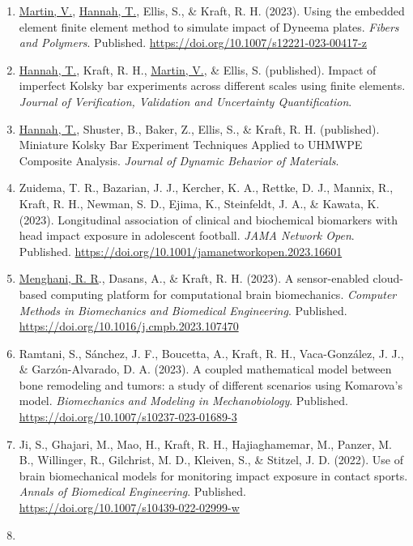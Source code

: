 \documentclass[11pt]{article}
\begin{document}
\begin{enumerate}
\def\labelenumi{\arabic{enumi}.}
\item
  \underline{Martin, V.}, \underline{Hannah, T.}, Ellis, S., \& Kraft, R. 
H. 
(2023). 
Using the
  embedded element finite element method to simulate impact of Dyneema
  plates. 
\emph{Fibers and Polymers}. 
Published.
  \url{https://doi.org/10.1007/s12221-023-00417-z}
\item
  \underline{Hannah, T.}, Kraft, R. 
H., \underline{Martin, V.}, \& Ellis, S. 
(published). 
Impact
  of imperfect Kolsky bar experiments across different scales using
  finite elements. 
\emph{Journal of Verification, Validation and
  Uncertainty Quantification}.
\item
  \underline{Hannah, T.}, Shuster, B., Baker, Z., Ellis, S., \& Kraft, R. 
H.
  (published). 
Miniature Kolsky Bar Experiment Techniques Applied to
  UHMWPE Composite Analysis. 
\emph{Journal of Dynamic Behavior of
  Materials}.
\item
  Zuidema, T. 
R., Bazarian, J. 
J., Kercher, K. 
A., Rettke, D. 
J.,
  Mannix, R., Kraft, R. 
H., Newman, S. 
D., Ejima, K., Steinfeldt, J. 
A.,
  \& Kawata, K. 
(2023). 
Longitudinal association of clinical and
  biochemical biomarkers with head impact exposure in adolescent
  football. 
\emph{JAMA Network Open}. 
Published.
  \url{https://doi.org/10.1001/jamanetworkopen.2023.16601}
\item
  \underline{Menghani, R. 
R}., Dasans, A., \& Kraft, R. 
H. 
(2023). 
A sensor-enabled
  cloud-based computing platform for computational brain biomechanics.
  \emph{Computer Methods in Biomechanics and Biomedical Engineering}.
  Published. 
\url{https://doi.org/10.1016/j.cmpb.2023.107470}
\item
  Ramtani, S., Sánchez, J. 
F., Boucetta, A., Kraft, R. 
H.,
  Vaca-González, J. 
J., \& Garzón-Alvarado, D. 
A. 
(2023). 
A coupled
  mathematical model between bone remodeling and tumors: a study of
  different scenarios using Komarova's model. 
\emph{Biomechanics and
  Modeling in Mechanobiology}. 
Published.
  \url{https://doi.org/10.1007/s10237-023-01689-3}
\item
  Ji, S., Ghajari, M., Mao, H., Kraft, R. 
H., Hajiaghamemar, M., Panzer,
  M. 
B., Willinger, R., Gilchrist, M. 
D., Kleiven, S., \& Stitzel, J. 
D.
  (2022). 
Use of brain biomechanical models for monitoring impact
  exposure in contact sports. 
\emph{Annals of Biomedical Engineering}.
  Published. 
\url{https://doi.org/10.1007/s10439-022-02999-w}
\item

\end{enumerate}
\end{document}
